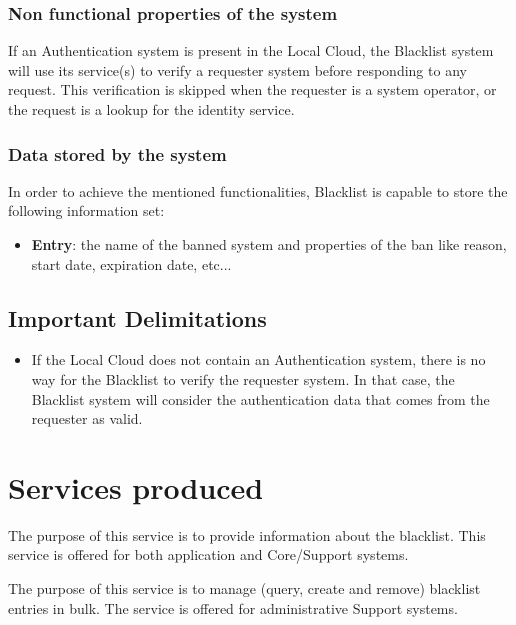 \documentclass[a4paper]{arrowhead}
\begin{document}
\subsubsection {Non functional properties of the system}
If an Authentication system is present in the Local Cloud, the Blacklist system will use its service(s) to verify a requester system before responding to any request. This verification is skipped when the requester is a system operator, or the request is a lookup for the identity service.

\subsubsection {Data stored by the system}
In order to achieve the mentioned functionalities, Blacklist is capable to store the following information set:

\begin{itemize}
    \item \textbf{Entry}: the name of the banned system and properties of the ban like reason, start date, expiration date, etc...
\end{itemize}

\subsection{Important Delimitations}
\label{sec:delimitations}
\begin{itemize}
    \item If the Local Cloud does not contain an Authentication system, there is no way for the Blacklist to verify the requester system. In that case, the Blacklist system will consider the authentication data that comes from the requester as valid.
\end{itemize}

\newpage

\section{Services produced}
\label{sec:services}

{}
The purpose of this service is to provide information about the blacklist. This service is offered for both application and Core/Support systems.

The purpose of this service is to manage (query, create and remove) blacklist entries in bulk. The service is offered for administrative Support systems.
\end{document}
